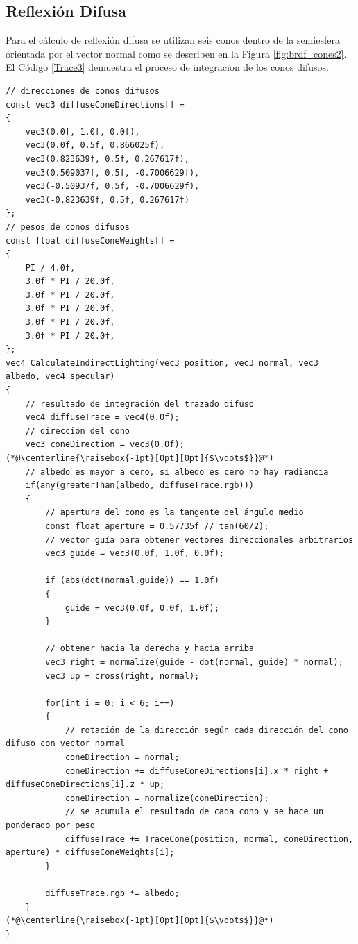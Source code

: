 \subsection{Reflexión Difusa} %
\label{sub:reflexion_difuse}
Para el cálculo de reflexión difusa se utilizan seis conos dentro de la semiesfera orientada por el vector normal como se describen en la Figura \ref{fig:brdf_cones2}. El Código \ref{Trace3} demuestra el proceso de integracion de los conos difusos.
\\
\begin{lstlisting}[caption={Conos para reflexión difusa.}, label=Trace3]
// direcciones de conos difusos
const vec3 diffuseConeDirections[] =
{
    vec3(0.0f, 1.0f, 0.0f),
    vec3(0.0f, 0.5f, 0.866025f),
    vec3(0.823639f, 0.5f, 0.267617f),
    vec3(0.509037f, 0.5f, -0.7006629f),
    vec3(-0.50937f, 0.5f, -0.7006629f),
    vec3(-0.823639f, 0.5f, 0.267617f)
};
// pesos de conos difusos
const float diffuseConeWeights[] =
{
    PI / 4.0f,
    3.0f * PI / 20.0f,
    3.0f * PI / 20.0f,
    3.0f * PI / 20.0f,
    3.0f * PI / 20.0f,
    3.0f * PI / 20.0f,
};
vec4 CalculateIndirectLighting(vec3 position, vec3 normal, vec3 albedo, vec4 specular)
{
    // resultado de integración del trazado difuso
    vec4 diffuseTrace = vec4(0.0f);
    // dirección del cono
    vec3 coneDirection = vec3(0.0f);
(*@\centerline{\raisebox{-1pt}[0pt][0pt]{$\vdots$}}@*)
    // albedo es mayor a cero, si albedo es cero no hay radiancia
    if(any(greaterThan(albedo, diffuseTrace.rgb)))
    {
        // apertura del cono es la tangente del ángulo medio
        const float aperture = 0.57735f // tan(60/2);
        // vector guía para obtener vectores direccionales arbitrarios
        vec3 guide = vec3(0.0f, 1.0f, 0.0f);

        if (abs(dot(normal,guide)) == 1.0f)
        {
            guide = vec3(0.0f, 0.0f, 1.0f);
        }

        // obtener hacia la derecha y hacia arriba
        vec3 right = normalize(guide - dot(normal, guide) * normal);
        vec3 up = cross(right, normal);

        for(int i = 0; i < 6; i++)
        {
            // rotación de la dirección según cada dirección del cono difuso con vector normal
            coneDirection = normal;
            coneDirection += diffuseConeDirections[i].x * right + diffuseConeDirections[i].z * up;
            coneDirection = normalize(coneDirection);
            // se acumula el resultado de cada cono y se hace un ponderado por peso
            diffuseTrace += TraceCone(position, normal, coneDirection, aperture) * diffuseConeWeights[i];
        }

        diffuseTrace.rgb *= albedo;
    }
(*@\centerline{\raisebox{-1pt}[0pt][0pt]{$\vdots$}}@*)
}
\end{lstlisting}

